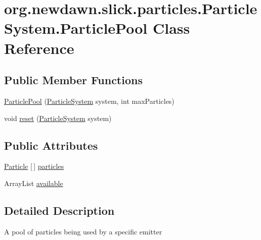 \hypertarget{classorg_1_1newdawn_1_1slick_1_1particles_1_1_particle_system_1_1_particle_pool}{}\section{org.\+newdawn.\+slick.\+particles.\+Particle\+System.\+Particle\+Pool Class Reference}
\label{classorg_1_1newdawn_1_1slick_1_1particles_1_1_particle_system_1_1_particle_pool}
\subsection*{Public Member Functions}
\begin{DoxyCompactItemize}
\item 
\mbox{\hyperlink{classorg_1_1newdawn_1_1slick_1_1particles_1_1_particle_system_1_1_particle_pool_a07642b4092c609693a51f6e6d7d728dc}{Particle\+Pool}} (\mbox{\hyperlink{classorg_1_1newdawn_1_1slick_1_1particles_1_1_particle_system}{Particle\+System}} system, int max\+Particles)
\item 
void \mbox{\hyperlink{classorg_1_1newdawn_1_1slick_1_1particles_1_1_particle_system_1_1_particle_pool_a09cbcb1e4ef2844bb213923afedbf536}{reset}} (\mbox{\hyperlink{classorg_1_1newdawn_1_1slick_1_1particles_1_1_particle_system}{Particle\+System}} system)
\end{DoxyCompactItemize}
\subsection*{Public Attributes}
\begin{DoxyCompactItemize}
\item 
\mbox{\hyperlink{classorg_1_1newdawn_1_1slick_1_1particles_1_1_particle}{Particle}} \mbox{[}$\,$\mbox{]} \mbox{\hyperlink{classorg_1_1newdawn_1_1slick_1_1particles_1_1_particle_system_1_1_particle_pool_a6b4dcf4ad8123ed1dd510d1e50ba7adf}{particles}}
\item 
Array\+List \mbox{\hyperlink{classorg_1_1newdawn_1_1slick_1_1particles_1_1_particle_system_1_1_particle_pool_aec7206b9670d0a0826151c81b89f8681}{available}}
\end{DoxyCompactItemize}


\subsection{Detailed Description}
A pool of particles being used by a specific emitter


